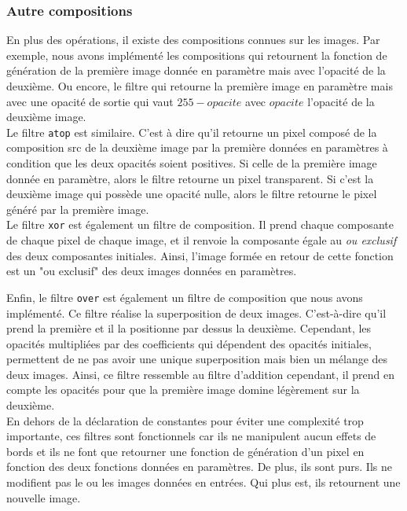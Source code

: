 \documentclass[11pt]{article}
\begin{document}
\subsubsection{Autre compositions}

En plus des opérations, il existe des compositions connues sur les images. Par exemple, nous avons implémenté les compositions qui retournent la fonction de génération de la première image donnée en paramètre mais avec l'opacité de la deuxième. Ou encore, le filtre qui retourne la première image en paramètre mais avec une opacité de sortie qui vaut $255 - opacite$ avec $opacite$ l'opacité de la deuxième image. \\

Le filtre \texttt{atop} est similaire. C'est à dire qu'il retourne un pixel composé de la composition src de la deuxième image par la première données en paramètres à condition que les deux opacités soient positives. Si celle de la première image donnée en paramètre, alors le filtre retourne un pixel transparent. Si c'est la deuxième image qui possède une opacité nulle, alors le filtre retourne le pixel généré par la première image. \\

Le filtre \texttt{xor} est également un filtre de composition. Il prend chaque composante de chaque pixel de chaque image, et il renvoie la composante égale au \textit{ou exclusif} des deux composantes initiales. Ainsi, l'image formée en retour de cette fonction est un "ou exclusif" des deux images données en paramètres.

Enfin, le filtre \texttt{over} est également un filtre de composition que nous avons implémenté. Ce filtre réalise la superposition de deux images. C'est-à-dire qu'il prend la première et il la positionne par dessus la deuxième. Cependant, les opacités multipliées par des coefficients qui dépendent des opacités initiales, permettent de ne pas avoir une unique superposition mais bien un mélange des deux images. Ainsi, ce filtre ressemble au filtre d'addition cependant, il prend en compte les opacités pour que la première image domine légèrement sur la deuxième. \\

En dehors de la déclaration de constantes pour éviter une complexité trop importante, ces filtres sont fonctionnels car ils ne manipulent aucun effets de bords et ils ne font que retourner une fonction de génération d'un pixel en fonction des deux fonctions données en paramètres.
De plus, ils sont purs. Ils ne modifient pas le ou les images données en entrées. Qui plus est, ils retournent une nouvelle image.  
\end{document}
